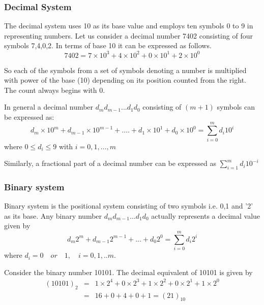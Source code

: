 	\subsubsection{Decimal System}
	
	The decimal system uses 10 as its base value and employs ten
	symbols 0 to 9 in representing numbers. Let us consider a decimal
	number 7402 consisting of four symbols 7,4,0,2. In terms of base
	10 it can be expressed as follows.
	$$7402=7\times10^{3}+4\times10^{2}+0\times10^{1}+2\times10^{0}$$
	
	So each of the symbols from a set of symbols denoting a number is
	multiplied with power of the base (10) depending on its position
	counted from the right. The count always begins with 0.
	
	In general a decimal number $d_{m}d_{m-1}...d_{1}d_{0}$ consisting
	of $(m+1)$ symbols can be expressed as:
	$$
	d_{m}\times10^{m}+d_{m-1}\times10^{m-1}+....+d_{1}\times10^{1}+d_{0}\times10^{0}=\sum\limits_{i=0}^{m}
	d_{i}10^{i}
	$$
	where $0\leq d_{i}\leq 9$ with $i=0,1,\ldots, m$
	
	Similarly, a fractional part of a decimal number can be expressed
	as $\sum\limits_{i=1}^{m}d_{i}10^{-i}$
	
	\subsubsection{Binary system} 
	Binary system is the positional system 	consisting of two symbols i.e. 0,1 and '2' as its base. Any binary number $d_{m}d_{m-1}...d_{1}d_{0}$ actually represents a decimal value given by
	$$
	d_{m}2^{m}+d_{m-1}2^{m-1}+...+d_{0}2^{0}=\sum\limits_{i=0}^{m}
	d_{i}2^{i}
	$$
	where $d_{i}=0\quad or\quad 1, \quad i=0,1,..m. $
	
	Consider the binary number 10101. The decimal equivalent of 10101
	is given by
	\begin{eqnarray}
	(10101)_{2} & = & 1\times 2^{4}+0\times 2^{3}+1\times
	2^{2}+0\times 2^{1}+1\times 2^{0} \nonumber \\
	& = & 16+0+4+0+1=(21)_{10} \nonumber
	\end{eqnarray}
	
